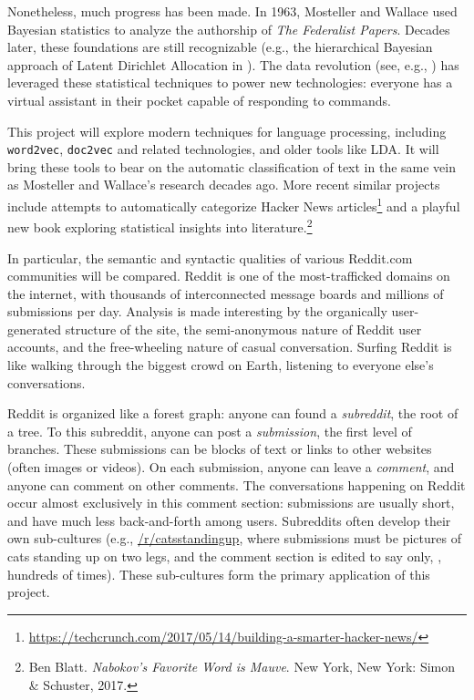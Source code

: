 \documentclass[]{article}
\begin{document}
Nonetheless, much progress has been made. In 1963, Mosteller and Wallace used Bayesian statistics to analyze the authorship of \emph{The Federalist Papers}\cite{Mosteller1963}. Decades later, these foundations are still recognizable (e.g., the hierarchical Bayesian approach of Latent Dirichlet Allocation in \cite{Blei2003}). The data revolution (see, e.g., \cite{fourthparadigm}) has leveraged these statistical techniques to power new technologies: everyone has a virtual assistant in their pocket capable of responding to commands.

This project will explore modern techniques for language processing, including \texttt{word2vec}, \texttt{doc2vec} and related technologies, and older tools like LDA. It will bring these tools to bear on the automatic classification of text in the same vein as Mosteller and Wallace's research decades ago. More recent similar projects include attempts to automatically categorize Hacker News articles\footnote{\url{https://techcrunch.com/2017/05/14/building-a-smarter-hacker-news/}} and a playful new book exploring statistical insights into literature.\footnote{Ben Blatt. \emph{Nabokov's Favorite Word is Mauve}. New York, New York: Simon \& Schuster, 2017.}

In particular, the semantic and syntactic qualities of various Reddit.com communities will be compared. Reddit is one of the most-trafficked domains on the internet, with thousands of interconnected message boards and millions of submissions per day\cite{redditblog:2015}. Analysis is made interesting by the organically user-generated structure of the site, the semi-anonymous nature of Reddit user accounts, and the free-wheeling nature of casual conversation. Surfing Reddit is like walking through the biggest crowd on Earth, listening to everyone else's conversations.

Reddit is organized like a forest graph: anyone can found a \emph{subreddit}, the root of a tree. To this subreddit, anyone can post a \emph{submission}, the first level of branches. These submissions can be blocks of text or links to other websites (often images or videos). On each submission, anyone can leave a \emph{comment}, and anyone can comment on other comments. The conversations happening on Reddit occur almost exclusively in this comment section: submissions are usually short, and have much less back-and-forth among users. Subreddits often develop their own sub-cultures (e.g., \href{https://reddit.com/r/catsstandingup}{/r/catsstandingup}, where submissions must be pictures of cats standing up on two legs, and the comment section is edited to say only, , hundreds of times). These sub-cultures form the primary application of this project.
\end{document}
